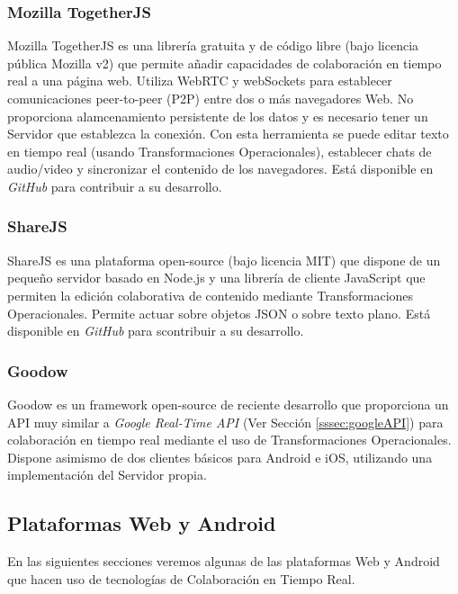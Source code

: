 	
	\subsubsection{Mozilla TogetherJS}

	Mozilla TogetherJS \cite{ref:togetherjs_api} es una librería gratuita y de código libre (bajo licencia pública Mozilla v2) que permite añadir capacidades de colaboración en tiempo real a una página web. Utiliza WebRTC y webSockets para establecer comunicaciones peer-to-peer (P2P) entre dos o más navegadores Web. No proporciona alamcenamiento persistente de los datos y es necesario tener un Servidor que establezca la conexión. Con esta herramienta se puede editar texto en tiempo real (usando Transformaciones Operacionales), establecer chats de audio/video y sincronizar el contenido de los navegadores. Está disponible en \textit{GitHub} \cite{ref:github} para contribuir a su desarrollo.
	
	\subsubsection{ShareJS}

	ShareJS \cite{ref:shareJS} es una plataforma open-source (bajo licencia MIT) que dispone de un pequeño servidor basado en Node.js y una librería de cliente JavaScript que permiten la edición colaborativa de contenido mediante Transformaciones Operacionales. Permite actuar sobre objetos JSON o sobre texto plano. Está disponible en \textit{GitHub} para scontribuir a su desarrollo.
	
	\subsubsection{Goodow}
	
	Goodow \cite{ref:goodow} es un framework open-source de reciente desarrollo que proporciona un API muy similar a \textit{Google Real-Time API} (Ver Sección \ref{sssec:googleAPI}) para colaboración en tiempo real mediante el uso de Transformaciones Operacionales. Dispone asimismo de dos clientes básicos para Android e iOS, utilizando una implementación del Servidor propia.	
	
	\subsection{Plataformas Web y Android}

	En las siguientes secciones veremos algunas de las plataformas Web y Android que hacen uso de tecnologías de Colaboración en Tiempo Real.
	
